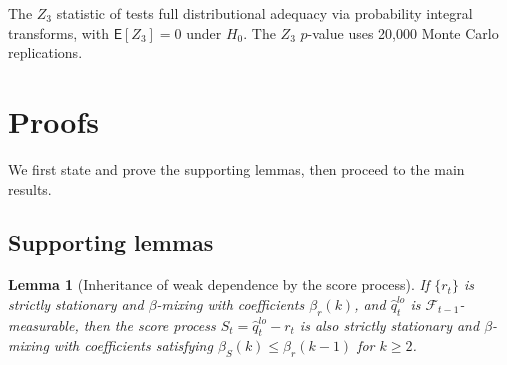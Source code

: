 \documentclass[preprint,11pt,authoryear]{elsarticle}
\newtheorem{lemma}[theorem]{Lemma}
\newcommand{\E}{\mathsf{E}}
\newcommand{\1}{\boldsymbol{1}}
\begin{document}
	The $Z_3$ statistic of \citet{acerbi2014back} tests full
	distributional adequacy via probability integral transforms, with
	$\E[Z_3] = 0$ under $H_0$. The $Z_3$ $p$-value uses 20,000 Monte
	Carlo replications.
	
	\section{Proofs}
	\label{app:proofs}
	
	We first state and prove the supporting lemmas, then proceed to the main results.
	
	\subsection{Supporting lemmas}
	
	\begin{lemma}[Inheritance of weak dependence by the score process]
		\label{lem:score_mixing}
		If $\{r_t\}$ is strictly stationary and $\beta$-mixing with coefficients $\beta_r(k)$, and $\hat q_t^{lo}$ is $\mathcal F_{t-1}$-measurable, then the score process $S_t=\hat q_t^{lo}-r_t$ is also strictly stationary and $\beta$-mixing with coefficients satisfying $\beta_S(k) \le \beta_r(k-1)$ for $k \ge 2$.
	\end{lemma}
	
\end{document}
